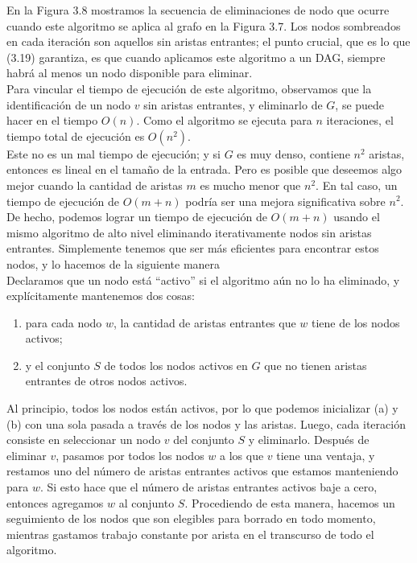 \documentclass[a4paper, 12pt]{book}
\theoremstyle{dotless}
\begin{document}
En la Figura 3.8 mostramos la secuencia de eliminaciones de nodo que ocurre cuando este algoritmo se aplica al grafo en la Figura 3.7. Los nodos sombreados en cada iteración son aquellos sin aristas entrantes; el punto crucial, que es lo que (3.19) garantiza, es que cuando aplicamos este algoritmo a un DAG, siempre habrá al menos un nodo disponible para eliminar.\\

Para vincular el tiempo de ejecución de este algoritmo, observamos que la identificación de un nodo $v$ sin aristas entrantes, y eliminarlo de $G$, se puede hacer en el tiempo $O(n)$. Como el algoritmo se ejecuta para $n$ iteraciones, el tiempo total de ejecución es $O(n^2)$.\\

Este no es un mal tiempo de ejecución; y si $G$ es muy denso, contiene $n^2$ aristas, entonces es lineal en el tamaño de la entrada. Pero es posible que deseemos algo mejor cuando la cantidad de aristas $m$ es mucho menor que $n^2$. En tal caso, un tiempo de ejecución de $O(m + n)$ podría ser una mejora significativa sobre $n^2$.\\

De hecho, podemos lograr un tiempo de ejecución de $O(m+n)$ usando el mismo algoritmo de alto nivel eliminando iterativamente nodos sin aristas entrantes. Simplemente tenemos que ser más eficientes para encontrar estos nodos, y lo hacemos de la siguiente manera\\

Declaramos que un nodo está ``activo'' si el algoritmo aún no lo ha eliminado, y explícitamente mantenemos dos cosas:\\

   \begin{enumerate}
   		\item para cada nodo $w$, la cantidad de aristas entrantes que $w$ tiene de los nodos activos; 
        \item y el conjunto $S$ de todos los nodos activos en $G$ que no tienen aristas entrantes de otros nodos activos.
   \end{enumerate}
    
Al principio, todos los nodos están activos, por lo que podemos inicializar (a) y (b) con una sola pasada a través de los nodos y las aristas. Luego, cada iteración consiste en seleccionar un nodo $v$ del conjunto $S$ y eliminarlo. Después de eliminar $v$, pasamos por todos los nodos $w$ a los que $v$ tiene una ventaja, y restamos uno del número de aristas entrantes activos que estamos manteniendo para $w$. Si esto hace que el número de aristas entrantes activos baje a cero, entonces agregamos $w$ al conjunto $S$. Procediendo de esta manera, hacemos un seguimiento de los nodos que son elegibles para borrado en todo momento, mientras gastamos trabajo constante por arista en el transcurso de todo el algoritmo.\\
\end{document}
